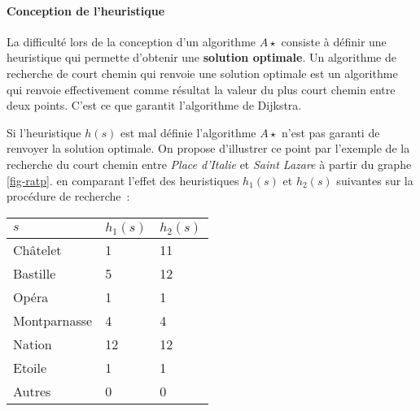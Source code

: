 \documentclass[11pt,openany]{book}
\newcommand{\kw}[1]{{\bf #1}} %
\begin{document}
\paragraph{Conception de l'heuristique} La difficulté lors de la
conception d'un algorithme $A\star$ consiste à définir une heuristique
qui permette d'obtenir une \kw{solution optimale}. 
Un algorithme de recherche de court chemin qui renvoie une solution
optimale est un algorithme qui renvoie effectivement comme résultat la
valeur du plus court chemin entre deux points. C'est ce que garantit
l'algorithme de Dijkstra.

Si l'heuristique $h(s)$ est mal définie l'algorithme $A\star$ n'est
pas garanti de renvoyer la solution optimale. On propose d'illustrer
ce point par l'exemple de la recherche du court chemin entre {\sl Place
d'Italie} et {\sl Saint Lazare} à partir du graphe \ref{fig-ratp}.
en comparant l'effet des heuristiques $h_1(s)$ et $h_2(s)$ suivantes
sur la procédure de recherche~:
\begin{center}
\begin{tabular}{lll}\\\toprule
  $s$ & $h_1(s)$&$h_2(s)$\\\midrule
Châtelet& 1&11\\
Bastille&5&12\\
Opéra & 1&1\\
Montparnasse&4&4\\
Nation & 12&12\\
Etoile & 1&1\\
Autres & 0&0\\\bottomrule
\end{tabular}
\end{center}
\begin{center}
\end{center}
\end{document}
